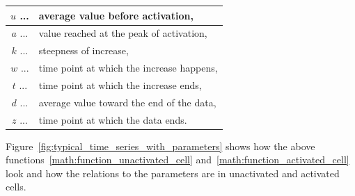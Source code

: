 \begin{table}[h!]
	\centering
	\begin{tabular}{|cl|}
		\hline
		$u$ ... & average value before activation, \\
		\hline
		$a$ ... & value reached at the peak of activation, \\
		\hline
		$k$ ... & steepness of increase, \\
		\hline
		$w$ ... & time point at which the increase happens, \\
		\hline
		$t$ ... & time point at which the increase ends, \\
		\hline
		$d$ ... & average value toward the end of the data, \\
		\hline
		$z$ ... & time point at which the data ends. \\
		\hline
	\end{tabular}
\end{table}

Figure~\ref{fig:typical_time_series_with_parameters} shows how the above functions~\ref{math:function_unactivated_cell} and~\ref{math:function_activated_cell} look and how the relations to the parameters are in unactivated and activated cells.

